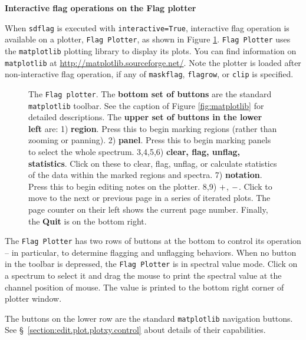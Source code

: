 \bigskip
{\bf Interactive flag operations on the Flag plotter}

When {\tt sdflag} is executed with {\tt interactive=True}, 
interactive flag operation is available on a plotter, {\tt Flag Plotter}, 
as shown in Figure \ref{fig:flagplotter}.
{\tt Flag Plotter} uses the {\tt matplotlib} plotting library to display 
its plots. You can find information on {\tt matplotlib} at
\url{http://matplotlib.sourceforge.net/}.
Note the plotter is loaded after non-interactive flag operation, 
if any of {\tt maskflag}, {\tt flagrow}, or {\tt clip} is specified.

\begin{figure}[h!]
\begin{center}
\caption{\label{fig:flagplotter} 
  The {\tt Flag plotter}.
  The {\bf bottom set of buttons} are the standard {\tt matplotlib} toolbar. 
  See the caption of Figure \ref{fig:matplotlib} for detailed descriptions.
  The {\bf upper set of buttons in the lower left} are:
  1) {\bf region}. Press this to begin marking regions (rather than
  zooming or panning).  
  2) {\bf panel}. Press this to begin marking panels to select the whole 
  spectrum.
  3,4,5,6) {\bf clear, flag, unflag, statistics}.  Click on these to clear, 
  flag, unflag, or calculate statistics of the data within the marked 
  regions and spectra.  
  7) {\bf notation}. Press this to begin editing notes on the plotter. 
  8,9) $ {\bf +} $, $ {\bf -} $. Click to move to the next or previous page in a series 
  of iterated plots. The page counter on their left shows the current page 
  number. Finally, the {\bf Quit} is on the bottom right.}
\hrulefill
\end{center}
\end{figure}

The {\tt Flag Plotter} has two rows of buttons at the bottom to 
control its operation -- in particular, to determine flagging and 
unflagging behaviors. 
When no button in the toolbar is depressed, 
the {\tt Flag Plotter} is in spectral value mode. 
Click on a spectrum to select it and drag the mouse to print 
the spectral value at the channel position of mouse. The value is printed 
to the bottom right corner of plotter window.

The buttons on the lower row are the standard 
{\tt matplotlib} navigation buttons. 
See \S~\ref{section:edit.plot.plotxy.control} about details of their 
capabilities.

